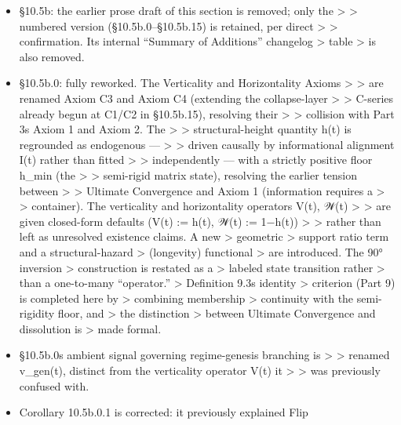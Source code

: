\documentclass[
]{article}
\begin{document}
\begin{itemize}
\item
  §10.5b: the earlier prose draft of this section is removed; only the
  \textgreater{} \textgreater{} numbered version (§10.5b.0--§10.5b.15)
  is retained, per direct \textgreater{} \textgreater{} confirmation.
  Its internal ``Summary of Additions'' changelog \textgreater{} table
  \textgreater{} is also removed.
\item
  §10.5b.0: fully reworked. The Verticality and Horizontality Axioms
  \textgreater{} \textgreater{} are renamed Axiom C3 and Axiom C4
  (extending the collapse-layer \textgreater{} \textgreater{} C-series
  already begun at C1/C2 in §10.5b.15), resolving their \textgreater{}
  \textgreater{} collision with Part 3\textquotesingle s Axiom 1 and
  Axiom 2. The \textgreater{} \textgreater{} structural-height quantity
  h(t) is regrounded as endogenous --- \textgreater{} \textgreater{}
  driven causally by informational alignment I(t) rather than fitted
  \textgreater{} \textgreater{} independently --- with a strictly
  positive floor h\_min (the \textgreater{} \textgreater{} semi-rigid
  matrix state), resolving the earlier tension between \textgreater{}
  \textgreater{} Ultimate Convergence and Axiom 1 (information requires
  a \textgreater{} \textgreater{} container). The verticality and
  horizontality operators V(t), 𝒲(t) \textgreater{} \textgreater{} are
  given closed-form defaults (V(t) := h(t), 𝒲(t) := 1−h(t))
  \textgreater{} \textgreater{} rather than left as unresolved existence
  claims. A new \textgreater{} geometric \textgreater{} support ratio
  term and a structural-hazard \textgreater{} (longevity) functional
  \textgreater{} are introduced. The 90° inversion \textgreater{}
  construction is restated as a \textgreater{} labeled state transition
  rather \textgreater{} than a one-to-many ``operator.'' \textgreater{}
  Definition 9.3\textquotesingle s identity \textgreater{} criterion
  (Part 9) is completed here by \textgreater{} combining membership
  \textgreater{} continuity with the semi-rigidity floor, and
  \textgreater{} the distinction \textgreater{} between Ultimate
  Convergence and dissolution is \textgreater{} made formal.
\item
  §10.5b.0\textquotesingle s ambient signal governing regime-genesis
  branching is \textgreater{} \textgreater{} renamed v\_gen(t), distinct
  from the verticality operator V(t) it \textgreater{} \textgreater{}
  was previously confused with.
\item
  Corollary 10.5b.0.1 is corrected: it previously explained Flip

\end{itemize}
\end{document}
